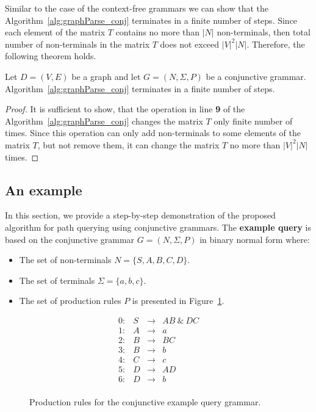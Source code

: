 Similar to the case of the context-free grammars we can show that the Algorithm~\ref{alg:graphParse_conj} terminates in a finite number of steps. Since each element of the matrix $T$ contains no more than $|N|$ non-terminals, then total number of non-terminals in the matrix $T$ does not exceed $|V|^2|N|$. Therefore, the following theorem holds.

\begin{mytheorem}\label{thm:finite_conj}
	Let $D = (V,E)$ be a graph and let $G =(N,\Sigma,P)$ be a conjunctive grammar. Algorithm~\ref{alg:graphParse_conj} terminates in a finite number of steps. 
\end{mytheorem}
\begin{proof}
	It is sufficient to show, that the operation in line \textbf{9} of the Algorithm~\ref{alg:graphParse_conj} changes the matrix $T$ only finite number of times. Since this operation can only add non-terminals to some elements of the matrix $T$, but not remove them, it can change the matrix $T$ no more than $|V|^2|N|$ times.
\end{proof}

\subsection{An example}
In this section, we provide a step-by-step demonstration of the proposed algorithm for path querying using conjunctive grammars. The \textbf{example query} is based on the conjunctive grammar $G = (N, \Sigma, P)$ in binary normal form where:
\begin{itemize}
	\item The set of non-terminals $N = \{S, A, B, C, D\}$.
	\item The set of terminals $\Sigma = \{a, b, c\}.$
	\item The set of production rules $P$ is presented in Figure~\ref{ProductionRulesExampleQueryConj}.
\end{itemize}

\begin{figure}[h]
	\[
	\begin{array}{rccl}
	0: & S & \rightarrow & AB \ \& \ DC \\ 
	1: & A & \rightarrow & a \\ 
	2: & B & \rightarrow & BC \\ 
	3: & B & \rightarrow & b \\
	4: & C & \rightarrow & c \\ 
	5: & D & \rightarrow & AD \\ 
	6: & D & \rightarrow & b \\ 
	\end{array}
	\]
	\caption{Production rules for the conjunctive example query grammar.}
	\label{ProductionRulesExampleQueryConj}
\end{figure}

